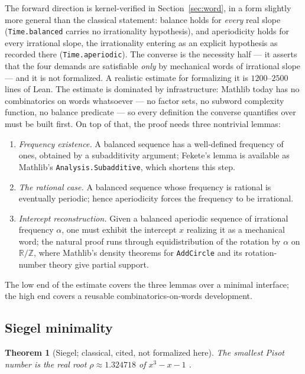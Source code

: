 \documentclass[11pt]{amsart}
\theoremstyle{plain}
\newtheorem{theorem}{Theorem}[section]
\theoremstyle{definition}
\theoremstyle{remark}
\begin{document}
The forward direction is kernel-verified in Section~\ref{sec:word}, in a form slightly more general than the classical statement: balance holds for \emph{every} real slope (\texttt{Time.balanced} carries no irrationality hypothesis), and aperiodicity holds for every irrational slope, the irrationality entering as an explicit hypothesis as recorded there (\texttt{Time.aperiodic}). The converse is the necessity half --- it asserts that the four demands are satisfiable \emph{only} by mechanical words of irrational slope --- and it is not formalized. A realistic estimate for formalizing it is $1200$--$2500$ lines of Lean. The estimate is dominated by infrastructure: Mathlib today has no combinatorics on words whatsoever --- no factor sets, no subword complexity function, no balance predicate --- so every definition the converse quantifies over must be built first. On top of that, the proof needs three nontrivial lemmas:
\begin{enumerate}
\item \emph{Frequency existence.} A balanced sequence has a well-defined frequency of ones, obtained by a subadditivity argument; Fekete's lemma is available as Mathlib's \texttt{Analysis.Subadditive}, which shortens this step.
\item \emph{The rational case.} A balanced sequence whose frequency is rational is eventually periodic; hence aperiodicity forces the frequency to be irrational.
\item \emph{Intercept reconstruction.} Given a balanced aperiodic sequence of irrational frequency $\alpha$, one must exhibit the intercept $x$ realizing it as a mechanical word; the natural proof runs through equidistribution of the rotation by $\alpha$ on $\mathbb{R}/\mathbb{Z}$, where Mathlib's density theorems for \texttt{AddCircle} and its rotation-number theory give partial support.
\end{enumerate}
The low end of the estimate covers the three lemmas over a minimal interface; the high end covers a reusable combinatorics-on-words development.

\subsection{Siegel minimality}

\begin{theorem}[Siegel; classical, cited, not formalized here]
\label{thm:siegel}
The smallest Pisot number is the real root $\rho \approx 1.324718$ of $x^3 - x - 1$ \cite{siegel1944}.
\end{theorem}
\end{document}
